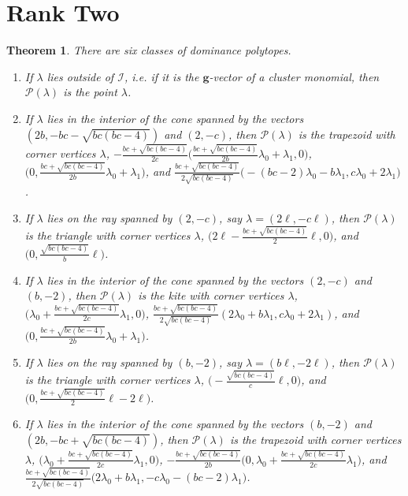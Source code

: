 \documentclass{amsart}
\newtheorem{theorem}{Theorem}
\numberwithin{theorem}{section}
\newcommand{\bfg}{\boldsymbol{g}}
\newcommand{\cI}{\mathcal{I}}
\newcommand{\cP}{\mathcal{P}}
\begin{document}
  \section{Rank Two}

  \begin{theorem}
    There are six classes of dominance polytopes.
    \begin{enumerate}
      \item If $\lambda$ lies outside of $\cI$, i.e. if it is the $\bfg$-vector of a cluster monomial, then $\cP(\lambda)$ is the point $\lambda$. 
      \item If $\lambda$ lies in the interior of the cone spanned by the vectors $(2b,-bc-\sqrt{bc(bc-4)})$ and $(2,-c)$, then $\cP(\lambda)$ is the trapezoid with corner vertices $\lambda$, $-\frac{bc+\sqrt{bc(bc-4)}}{2c}\big(\frac{bc+\sqrt{bc(bc-4)}}{2b}\lambda_0+\lambda_1,0\big)$, $\big(0,\frac{bc+\sqrt{bc(bc-4)}}{2b}\lambda_0+\lambda_1\big)$, and $\frac{bc+\sqrt{bc(bc-4)}}{2\sqrt{bc(bc-4)}}\big(-(bc-2)\lambda_0-b\lambda_1,c\lambda_0+2\lambda_1\big)$.
      \item If $\lambda$ lies on the ray spanned by $(2,-c)$, say $\lambda=(2\ell,-c\ell)$, then $\cP(\lambda)$ is the triangle with corner vertices $\lambda$, $\big(2\ell-\frac{bc+\sqrt{bc(bc-4)}}{2}\ell,0\big)$, and $\big(0,\frac{\sqrt{bc(bc-4)}}{b}\ell\big)$.
      \item If $\lambda$ lies in the interior of the cone spanned by the vectors $(2,-c)$ and $(b,-2)$, then $\cP(\lambda)$ is the kite with corner vertices $\lambda$, $\big(\lambda_0+\frac{bc+\sqrt{bc(bc-4)}}{2c}\lambda_1,0\big)$, $\frac{bc+\sqrt{bc(bc-4)}}{2\sqrt{bc(bc-4)}}(2\lambda_0+b\lambda_1,c\lambda_0+2\lambda_1)$, and $\big(0,\frac{bc+\sqrt{bc(bc-4)}}{2b}\lambda_0+\lambda_1\big)$.
      \item If $\lambda$ lies on the ray spanned by $(b,-2)$, say $\lambda=(b\ell,-2\ell)$, then $\cP(\lambda)$ is the triangle with corner vertices $\lambda$, $\big(-\frac{\sqrt{bc(bc-4)}}{c}\ell,0\big)$, and $\big(0,\frac{bc+\sqrt{bc(bc-4)}}{2}\ell-2\ell\big)$.
      \item If $\lambda$ lies in the interior of the cone spanned by the vectors $(b,-2)$ and $(2b,-bc+\sqrt{bc(bc-4)})$, then $\cP(\lambda)$ is the trapezoid with corner vertices $\lambda$, $\big(\lambda_0+\frac{bc+\sqrt{bc(bc-4)}}{2c}\lambda_1,0\big)$, $-\frac{bc+\sqrt{bc(bc-4)}}{2b}\big(0,\lambda_0+\frac{bc+\sqrt{bc(bc-4)}}{2c}\lambda_1\big)$, and $\frac{bc+\sqrt{bc(bc-4)}}{2\sqrt{bc(bc-4)}}\big(2\lambda_0+b\lambda_1,-c\lambda_0-(bc-2)\lambda_1\big)$.
    \end{enumerate}
  \end{theorem}
\end{document}
